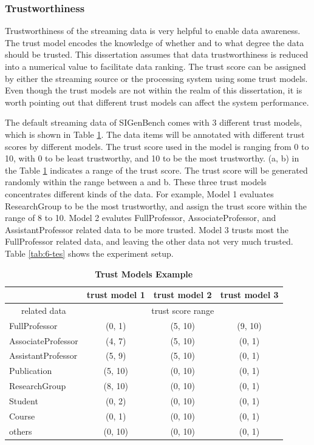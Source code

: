 \subsubsection{Trustworthiness}
Trustworthiness of the streaming data is very helpful to enable data awareness. 
The trust model encodes the knowledge of whether and to what degree the data should be trusted.
This dissertation assumes that data trustworthiness is reduced into a numerical value to facilitate data ranking.
The trust score can be assigned by either the streaming source or the processing system using some trust models. 
Even though the trust models are not within the realm of this dissertation, it is worth pointing out that different trust models can affect the system performance. 

The default streaming data of SIGenBench comes with 3 different trust models, which is shown in Table \ref{tab:6-tme}.
The data items will be annotated with different trust scores by different models.
The trust score used in the model is ranging from 0 to 10, with 0 to be least trustworthy, and 10 to be the most trustworthy.
(a, b) in the Table \ref{tab:6-tme} indicates a range of the trust score. 
The trust score will be generated randomly within the range between a and b. 
These three trust models concentrates different kinds of the data. 
For example, Model 1 evaluates ResearchGroup to be the most trustworthy, and assign the trust score within the range of 8 to 10.
Model 2 evalutes FullProfessor, AssociateProfessor, and AssistantProfessor related data to be more trusted.
Model 3 trusts most the FullProfessor related data, and leaving the other data not very much trusted.
Table \ref{tab:6-tes} shows the experiment setup.

\begin{table}[!htbp]
	\centering
    \caption{\textbf{Trust Models Example}}
    \label{tab:6-tme}
    \begin{tabular}{|l||c|c|c|} \hline
    	& trust model 1 & trust model 2 & trust model 3 \\ \hline
     \multicolumn{1}{|c||}{related data} & \multicolumn{3}{c|}{trust score range} \\ \hhline{|=#=|=|=|}
     FullProfessor & (0, 1) & (5, 10) & (9, 10) \\ \hline
     AssociateProfessor & (4, 7) & (5, 10) & (0, 1) \\ \hline
     AssistantProfessor & (5, 9) & (5, 10) & (0, 1) \\ \hline
     Publication & (5, 10) & (0, 10) & (0, 1) \\ \hline
     ResearchGroup & (8, 10) & (0, 10) & (0, 1) \\ \hline
     Student & (0, 2) & (0, 10) & (0, 1) \\ \hline
     Course & (0, 1) & (0, 10) & (0, 1) \\ \hline
     others & (0, 10) & (0, 10) & (0, 1) \\ \hline    
    \end{tabular}
\end{table} 

